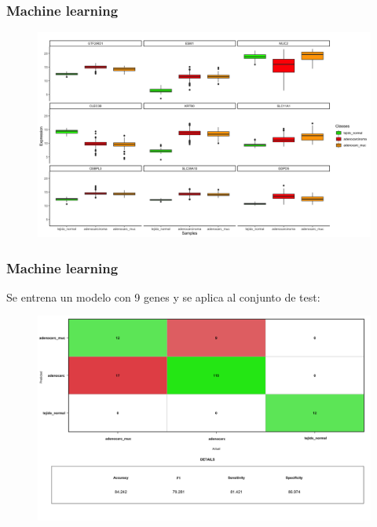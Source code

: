 \documentclass{beamer}
\begin{document}

\begin{frame}\frametitle{Machine learning}
	\begin{figure}
		\centering
		\includegraphics[width=.9\textwidth]{images/38_cr_multiclase_24_rf_boxplots_mejor_metodo.png}
	\end{figure}
\end{frame}


\begin{frame}\frametitle{Machine learning}
	Se entrena un modelo con 9 genes y se aplica al conjunto de test:
	\begin{figure}
		\centering
		\includegraphics[width=.9\textwidth]{images/40_cr_multiclase_25_rf_matriz_confusion_mejor_metodo.png}
	\end{figure}
\end{frame}
\end{document}
